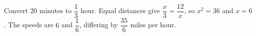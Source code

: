 Convert $20$ minutes to $\dfrac{1}{3}$ hour. Equal distances give $\dfrac{x}{3}=\dfrac{12}{x}$, so $x^2=36$ and $x=6$. The speeds are $6$ and $\dfrac{1}{6}$, differing by $\boxed{\dfrac{35}{6}}$ miles per hour.
